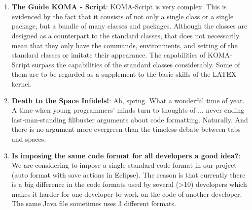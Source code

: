 

%
\cleardoublepage
{}


\chapter{}


\begin{englishtext}
\begin{enumerate}

    \item \textbf{The Guide KOMA - Script}: KOMA-Script  is very complex. This
    is evidenced by the fact that it consists of not only a single class or a
    single package, but a bundle of many classes and packages. Although the
    classes are designed as a counterpart to the standard classes, that does not
    necessarily mean that they only have the commands, environments, and setting
    of the standard classes or imitate their appearance. The capabilities of
    KOMA-Script surpass the capabilities of the standard classes considerably.
    Some of them are to be regarded as a supplement to the basic skills of the
    LATEX kernel. \cite{komaScrguien}

    \item \textbf{Death to the Space Infidels!}: Ah, spring. What a wonderful time of
    year. A time when young programmers' minds turn to thoughts of ... never
    ending last-man-standing filibuster arguments about code formatting.
    Naturally. And there is no argument more evergreen than the timeless debate
    between tabs and spaces. \cite{Atwood}

    \item \textbf{Is imposing the same code format for all developers a good
    idea?}: We are considering to impose a single standard code format in our
    project (auto format with save actions in Eclipse). The reason is that
    currently there is a big difference in the code formats used by several
    (>10) developers which makes it harder for one developer to work on the code
    of another developer. The same Java file sometimes uses 3 different formats.
    \cite{Geukens}


\end{enumerate}
\end{englishtext}
